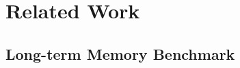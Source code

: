 \documentclass{article}
\theoremstyle{plain}
\theoremstyle{definition}
\theoremstyle{remark}
\begin{document}
\section{Related Work}

\subsection{Long-term Memory Benchmark}
\end{document}
